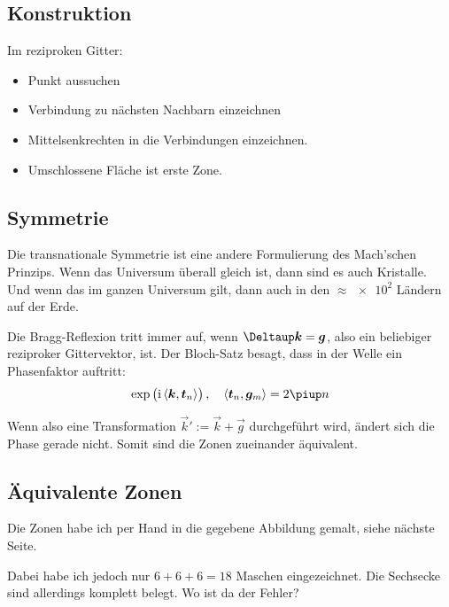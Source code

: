 \subsection{Konstruktion}

Im reziproken Gitter:

\begin{itemize}
	\item Punkt aussuchen
	\item Verbindung zu nächsten Nachbarn einzeichnen
	\item Mittelsenkrechten in die Verbindungen einzeichnen.
	\item Umschlossene Fläche ist erste Zone.
\end{itemize}

\subsection{Symmetrie}

\begin{small}
Die transnationale Symmetrie ist eine andere Formulierung des Mach'schen
Prinzips. Wenn das Universum überall gleich ist, dann sind es auch Kristalle.
Und wenn das im ganzen Universum gilt, dann auch in den $\approx \num{e2}$
Ländern auf der Erde.
\end{small}

Die Bragg-Reflexion tritt immer auf, wenn $\Deltaup \vec k = \vec g$, also ein
beliebiger reziproker Gittervektor, ist. Der Bloch-Satz besagt, dass in der
Welle ein Phasenfaktor auftritt: \cite[Vorlesung 16, Folie
7]{meschede/physik441}
\[
	\exp\del{\ii \inner{\vec k}{\vec t_n}}
	\eqnsep
	\inner{\vec t_n}{\vec g_m} = 2\piup n
\]

Wenn also eine Transformation $\vec k' := \vec k + \vec g$ durchgeführt wird,
ändert sich die Phase gerade nicht. Somit sind die Zonen zueinander äquivalent.

\subsection{Äquivalente Zonen}

Die Zonen habe ich per Hand in die gegebene Abbildung gemalt, siehe nächste
Seite.

Dabei habe ich jedoch nur $6+6+6=18$ Maschen eingezeichnet. Die Sechsecke sind
allerdings komplett belegt. Wo ist da der Fehler?




\IfFileExists{\bibliographyfile}{
	
}{}



